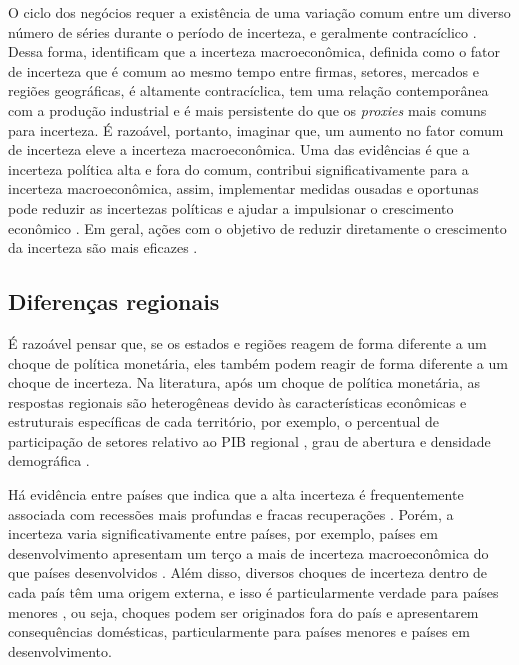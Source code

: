O ciclo dos negócios requer a existência de uma variação comum entre um diverso número de séries durante o período de incerteza, e geralmente contracíclico \cite{jurado2015measuring}.
Dessa forma,  identificam que a incerteza macroeconômica, definida como o fator de incerteza que é comum ao mesmo tempo entre firmas, setores, mercados e regiões geográficas, é altamente contracíclica, tem uma relação contemporânea com a produção industrial e é mais persistente do que os \textit{proxies} mais comuns para incerteza. 
É razoável, portanto, imaginar que, um aumento no fator comum de incerteza eleve a incerteza macroeconômica. Uma das evidências é que a incerteza política alta e fora do comum, contribui significativamente para a incerteza macroeconômica, assim, implementar medidas ousadas e oportunas pode reduzir as incertezas políticas e ajudar a impulsionar o crescimento econômico \cite{FMI2012outlook}. Em geral, ações com o objetivo de reduzir diretamente o crescimento da incerteza são mais eficazes \cite{bloom2009impact}.
\par

\subsection{Diferenças regionais}
É razoável pensar que, se os estados e regiões reagem de forma diferente a um choque de política monetária, eles também podem reagir de forma diferente a um choque de incerteza. Na literatura, após um choque de política monetária, as respostas regionais são heterogêneas devido às características econômicas e estruturais específicas de cada território, por exemplo, o percentual de participação de setores relativo ao \gls{PIB} regional \cite{carlino1998differential, carlino1999states}, grau de abertura e densidade demográfica \cite{rocha2011estados}. 
\par

Há evidência entre países que indica que a alta incerteza é frequentemente associada com recessões mais profundas e fracas recuperações \cite{FMI2012outlook}. Porém, a incerteza varia significativamente entre países, por exemplo, países em desenvolvimento apresentam um terço a mais de incerteza macroeconômica do que países desenvolvidos \cite{bloom2014fluctuations}. Além disso, diversos choques de incerteza dentro de cada país têm uma origem externa, e isso é particularmente verdade para países menores \cite{bloom2017observations}, ou seja, choques podem ser originados fora do país e apresentarem consequências domésticas, particularmente para países menores e países em desenvolvimento.
\par

